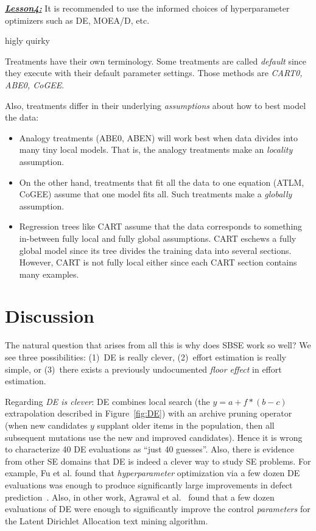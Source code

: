 \documentclass[10pt,conference]{IEEEtran}
\newcommand{\bi}{\begin{itemize}}
\newcommand{\ei}{\end{itemize}}
\newcommand{\fig}[1]{Figure~\ref{fig:#1}}
\newenvironment{result}[2]
{\begin{myshadowbox}\textbf{\textit{\underline{Lesson#1:}}} #2}{ 
\end{myshadowbox}}
\begin{document}
 
    \begin{result}{4}
    It  is recommended
    to use the informed choices of hyperparameter optimizers such as DE, MOEA/D, etc.
 \end{result}
  
  
higly quirky



Treatments have their own terminology.
 Some treatments are  called {\em default} since they execute with their
default parameter settings. Those methods are {\em CART0, ABE0, CoGEE}.

Also, treatments differ in  their underlying  {\em assumptions} about how to best model the data:
\bi
\item Analogy treatments (ABE0, ABEN) will work best when data divides into many tiny local models. That is, the analogy treatments make an {\em locality} assumption.
\item On the other hand, treatments that fit all the data to one equation (ATLM, CoGEE) assume that one model fits all. Such treatments make a {\em globally} assumption.
\item Regression trees like CART assume that the data corresponds to something in-between fully local and fully global assumptions. CART eschews a fully global model since its tree divides the training data into several sections. However, CART is not fully local either since each CART section contains many examples.
\ei


\section{Discussion}\label{sect:discussion}

The natural question that arises from all this is why does SBSE work so well? We see  three
possibilities: (1)~DE is really clever, (2)~effort estimation is really simple, or (3)~there exists a previously undocumented {\em floor effect} in effort
estimation.

Regarding {\em DE is clever}:  DE combines  local search  (the $y=a+f*(b-c)$ extrapolation described in \fig{DE}) with an archive pruning operator (when    new candidates $y$   supplant older items in the population, then all subsequent mutations use the new and improved candidates). Hence it is wrong to characterize   40 DE evaluations as ``just 40 guesses''. Also, there is evidence from other SE domains that
DE is indeed a clever way to study SE problems. For example, Fu et al. found that {\em hyperparameter} optimization
via a few dozen DE evaluations
was enough to produce significantly large improvements in defect prediction~\cite{Fu2016TuningFS}.
Also, in other work, Agrawal et al.~\cite{AGRAWAL2018} found that  a few
dozen evaluations of DE were enough
to significantly improve the control {\em parameters}
for the Latent Dirichlet Allocation text
mining algorithm.
\end{document}
